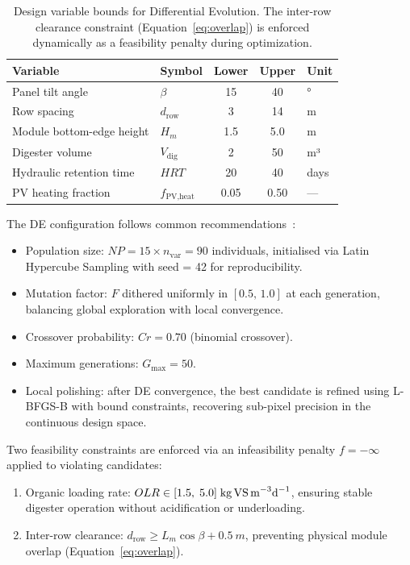 \begin{table}[H]
	\caption{Design variable bounds for Differential Evolution.
		The inter-row clearance constraint (Equation~\ref{eq:overlap})
		is enforced dynamically as a feasibility penalty during optimization.}
	\label{tab:bounds}
	\centering
	\begin{tabular}{llccl}
		\toprule
		\textbf{Variable} & \textbf{Symbol}
		& \textbf{Lower} & \textbf{Upper} & \textbf{Unit} \\
		\midrule
		Panel tilt angle          & $\beta$              & 15  & 40   & ° \\
		Row spacing               & $d_{\text{row}}$     & 3   & 14   & m \\
		Module bottom-edge height & $H_m$                & 1.5 & 5.0  & m \\
		Digester volume           & $V_{\text{dig}}$     & 2   & 50   & m³ \\
		Hydraulic retention time  & $HRT$                & 20  & 40   & days \\
		PV heating fraction       & $f_{\text{PV,heat}}$ & 0.05& 0.50 & --- \\
		\bottomrule
	\end{tabular}
\end{table}

The DE configuration follows common recommendations~\citep{storn1997, das2011}:

\begin{itemize}[leftmargin=*, noitemsep]
	\item Population size: $NP = 15 \times n_{\text{var}} = 90$
	individuals, initialised via Latin Hypercube Sampling
	with seed = 42 for reproducibility.
	\item Mutation factor: $F$ dithered uniformly in $[0.5,\,1.0]$
	at each generation, balancing global exploration with
	local convergence.
	\item Crossover probability: $Cr = 0.70$ (binomial crossover).
	\item Maximum generations: $G_{\max} = 50$.
	\item Local polishing: after DE convergence, the best candidate
	is refined using L-BFGS-B with bound constraints,
	recovering sub-pixel precision in the continuous
	design space.
\end{itemize}

Two feasibility constraints are enforced via an infeasibility
penalty $f = -\infty$ applied to violating candidates:
\begin{enumerate}[leftmargin=*, noitemsep]
	\item Organic loading rate: $OLR \in
	[1.5,\;5.0]\;\text{kg\,VS\,m}^{-3}\text{d}^{-1}$,
	ensuring stable digester operation without
	acidification or underloading.
	\item Inter-row clearance:
	$d_{\text{row}} \geq L_m\cos\beta + \SI{0.5}{m}$,
	preventing physical module overlap
	(Equation~\ref{eq:overlap}).
\end{enumerate}

